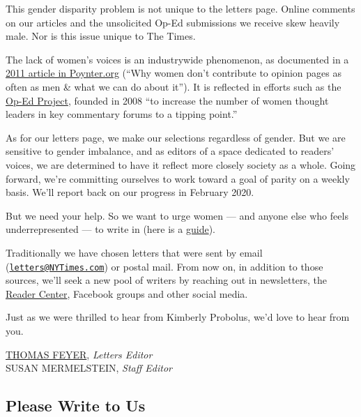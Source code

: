 This gender disparity problem is not unique to the letters page. Online
comments on our articles and the unsolicited Op-Ed submissions we
receive skew heavily male. Nor is this issue unique to The Times.

The lack of women's voices is an industrywide phenomenon, as documented
in a
\href{https://www.poynter.org/reporting-editing/2011/why-women-dont-contribute-to-opinion-pages-as-often-as-men-what-we-can-do-about-it/}{2011
article in Poynter.org} (``Why women don't contribute to opinion pages
as often as men \& what we can do about it''). It is reflected in
efforts such as the \href{https://www.theopedproject.org/}{Op-Ed
Project}, founded in 2008 ``to increase the number of women thought
leaders in key commentary forums to a tipping point.''

As for our letters page, we make our selections regardless of gender.
But we are sensitive to gender imbalance, and as editors of a space
dedicated to readers' voices, we are determined to have it reflect more
closely society as a whole. Going forward, we're committing ourselves to
work toward a goal of parity on a weekly basis. We'll report back on our
progress in February 2020.

But we need your help. So we want to urge women --- and anyone else who
feels underrepresented --- to write in (here is a
\href{https://help.nytimes3xbfgragh.onion/hc/en-us/articles/115014925288-How-to-submit-a-letter-to-the-editor}{guide}).

Traditionally we have chosen letters that were sent by email
(\href{mailto:letters@NYTimes.com}{\nolinkurl{letters@NYTimes.com}}) or
postal mail. From now on, in addition to those sources, we'll seek a new
pool of writers by reaching out in newsletters, the
\href{https://www.nytimes3xbfgragh.onion/section/reader-center}{Reader
Center}, Facebook groups and other social media.

Just as we were thrilled to hear from Kimberly Probolus, we'd love to
hear from you.

\href{https://www.nytimes3xbfgragh.onion/2004/05/23/opinion/23READ.html}{THOMAS
FEYER}, \emph{Letters Editor}\\
SUSAN MERMELSTEIN, \emph{Staff Editor}

\hypertarget{please-write-to-us}{%
\subsection{Please Write to Us}\label{please-write-to-us}}

